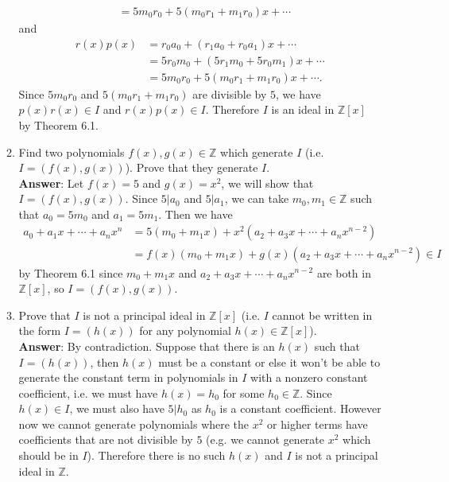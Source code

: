 \documentclass{article}
\begin{document}
\begin{enumerate}
\begin{enumerate}
\begin{align*}
                                       & =5m_0r_0+5(m_0r_1+m_1r_0)x+\cdots
                        \end{align*}
                        and \begin{align*}
                              r(x)p(x) & =r_0a_0+(r_1a_0+r_0a_1)x+\cdots    \\
                                       & =5r_0m_0+(5r_1m_0+5r_0m_1)x+\cdots \\
                                       & =5m_0r_0+5(m_0r_1+m_1r_0)x+\cdots.
                        \end{align*}
                        Since $5m_0r_0$ and $5(m_0r_1+m_1r_0)$ are divisible by $5$, we have $p(x)r(x)\in I$ and $r(x)p(x)\in I$. Therefore $I$ is an ideal in $\mathbb{Z}[x]$ by Theorem 6.1.
                  \item Find two polynomials $f(x),g(x)\in\mathbb{Z}$ which generate $I$ (i.e. $I=(f(x),g(x))$). Prove that they generate $I$.\\
                        \textbf{Answer}: Let $f(x)=5$ and $g(x)=x^2$, we will show that $I=(f(x),g(x))$. Since $5|a_0$ and $5|a_1$, we can take $m_0,m_1\in\mathbb{Z}$ such that $a_0=5m_0$ and $a_1=5m_1$. Then we have \begin{align*}
                              a_0+a_1x+\cdots+a_nx^n & =5(m_0+m_1x)+x^2(a_2+a_3x+\cdots+a_nx^{n-2})          \\
                                                     & =f(x)(m_0+m_1x)+g(x)(a_2+a_3x+\cdots+a_nx^{n-2})\in I
                        \end{align*}
                        by Theorem 6.1 since $m_0+m_1x$ and $a_2+a_3x+\cdots+a_nx^{n-2}$ are both in $\mathbb{Z}[x]$, so $I=(f(x),g(x))$.
                  \item Prove that $I$ is not a principal ideal in $\mathbb{Z}[x]$ (i.e. $I$ cannot be written in the form $I=(h(x))$ for any polynomial $h(x)\in\mathbb{Z}[x]$).\\
                        \textbf{Answer}: By contradiction. Suppose that there is an $h(x)$ such that $I=(h(x))$, then $h(x)$ must be a constant or else it won't be able to generate the constant term in polynomials in $I$ with a nonzero constant coefficient, i.e. we must have $h(x)=h_0$ for some $h_0\in\mathbb{Z}$. Since $h(x)\in I$, we must also have $5|h_0$ as $h_0$ is a constant coefficient. However now we cannot generate polynomials where the $x^2$ or higher terms have coefficients that are not divisible by $5$ (e.g. we cannot generate $x^2$ which should be in $I$). Therefore there is no such $h(x)$ and $I$ is not a principal ideal in $\mathbb{Z}$.

\end{enumerate}
\end{enumerate}
\end{document}

